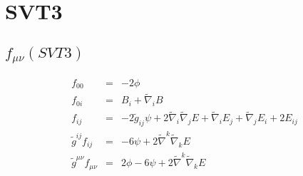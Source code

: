 \documentclass[10pt,letterpaper]{article}
\numberwithin{equation}{section}
\begin{document}
\section{SVT3}
%
\subsection{$f_{\mu\nu}(SVT3)$}
\begin{eqnarray}
f_{00} &=& -2\phi
 \nonumber\\
f_{0i} &=& B_i + \tilde\nabla_i B
\nonumber\\
f_{ij} &=& -2\tilde g_{ij} \psi + 2\tilde\nabla_i\tilde\nabla_j E + \tilde\nabla_i E_j + \tilde\nabla_j E_i + 2E_{ij}
 \nonumber\\
\tilde g^{ij} f_{ij} &=& -6\psi + 2\tilde\nabla^k\tilde\nabla_k E
 \nonumber\\
\tilde g^{\mu\nu} f_{\mu\nu} &=& 2\phi-6\psi + 2\tilde\nabla^k\tilde\nabla_k E
\end{eqnarray}

\end{document}
